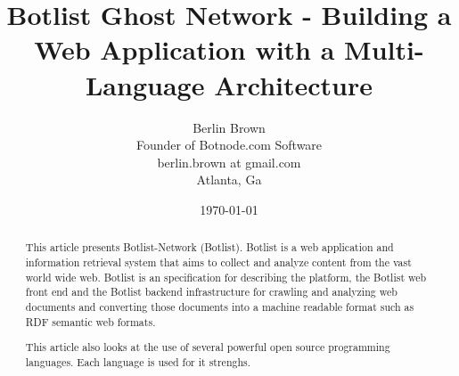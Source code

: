 \documentclass[12pt]{report}
\begin{document}
\title{Botlist Ghost Network - Building a Web Application with a Multi-Language Architecture}

\author{Berlin Brown\\
  Founder of Botnode.com Software\\
  berlin.brown at gmail.com\\
  Atlanta, Ga\\
  \date{\today}}

\maketitle


\begin{abstract}
This article presents Botlist-Network (Botlist).  Botlist is a 
web application and information retrieval system that aims to collect
and analyze content from the vast world wide web.  Botlist is an specification
for describing the platform, the Botlist web front end and the Botlist backend
infrastructure for crawling and analyzing web documents and converting those
documents into a machine readable format such as RDF semantic web formats.

This article also looks at the use of several powerful open source programming
languages.  Each language is used for it strenghs.
\end{abstract}

\tableofcontents













\nocite{*}

\end{document}
